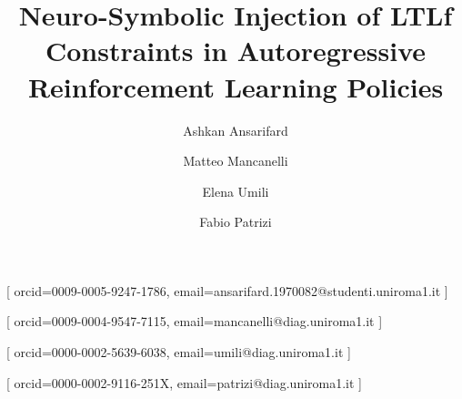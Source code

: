 \documentclass[
]{ceurart}
\begin{document}


\title{Neuro-Symbolic Injection of LTLf Constraints in Autoregressive Reinforcement Learning Policies}

    
\author{Ashkan Ansarifard}[%
orcid=0009-0005-9247-1786,
email=ansarifard.1970082@studenti.uniroma1.it
]
\address{University of Rome La Sapienza, Rome, Italy}

\author{Matteo Mancanelli}[%
orcid=0009-0004-9547-7115,
email=mancanelli@diag.uniroma1.it
]

\author{Elena Umili}[%
orcid=0000-0002-5639-6038,
email=umili@diag.uniroma1.it
]

\author{Fabio Patrizi}[%
orcid=0000-0002-9116-251X,
email=patrizi@diag.uniroma1.it
]

\end{document}

